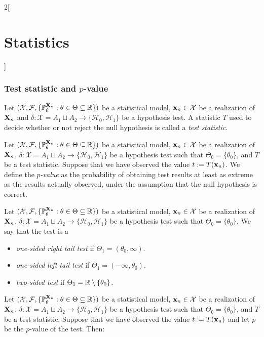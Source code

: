 \documentclass[../../../main.tex]{subfiles}
\begin{document}
\begin{multicols}{2}[\section{Statistics}]
  \subsubsection{Test statistic and \texorpdfstring{$p$}{p}-value}
  \begin{definition}
    Let $(\mathcal{X},\mathcal{F},\{\mathbb{P}_\theta^{\boldsymbol{\mathrm{X}}_n}:\theta\in\Theta\subseteq\mathbb{R}\})$ be a statistical model, $\boldsymbol{\mathrm{x}}_n\in\mathcal{X}$ be a realization of $\boldsymbol{\mathrm{X}}_n$ and $\delta:\mathcal{X}=A_1\sqcup A_2\rightarrow\{\mathcal{H}_0,\mathcal{H}_1\}$ be a hypothesis test. A statistic $T$ used to decide whether or not reject the null hypothesis is called a \emph{test statistic}.
  \end{definition}
  \begin{definition}
    Let $(\mathcal{X},\mathcal{F},\{\mathbb{P}_\theta^{\boldsymbol{\mathrm{X}}_n}:\theta\in\Theta\subseteq\mathbb{R}\})$ be a statistical model, $\boldsymbol{\mathrm{x}}_n\in\mathcal{X}$ be a realization of $\boldsymbol{\mathrm{X}}_n$, $\delta:\mathcal{X}=A_1\sqcup A_2\rightarrow\{\mathcal{H}_0,\mathcal{H}_1\}$ be a hypothesis test such that $\Theta_0=\{\theta_0\}$, and $T$ be a test statistic. Suppose that we have observed the value $t:=T(\boldsymbol{\mathrm{x}}_n)$. We define the \emph{$p$-value} as the probability of obtaining test results at least as extreme as the results actually observed, under the assumption that the null hypothesis is correct.
  \end{definition}
  \begin{definition}
    Let $(\mathcal{X},\mathcal{F},\{\mathbb{P}_\theta^{\boldsymbol{\mathrm{X}}_n}:\theta\in\Theta\subseteq\mathbb{R}\})$ be a statistical model, $\boldsymbol{\mathrm{x}}_n\in\mathcal{X}$ be a realization of $\boldsymbol{\mathrm{X}}_n$, $\delta:\mathcal{X}=A_1\sqcup A_2\rightarrow\{\mathcal{H}_0,\mathcal{H}_1\}$ be a hypothesis test such that $\Theta_0=\{\theta_0\}$. We say that the test is a
    \begin{itemize}
      \item \emph{one-sided right tail test} if $\Theta_1=(\theta_0,\infty)$.
      \item \emph{one-sided left tail test} if $\Theta_1=(-\infty,\theta_0)$.
      \item \emph{two-sided test} if $\Theta_1=\mathbb{R}\setminus\{\theta_0\}$.
    \end{itemize}
  \end{definition}
  \begin{proposition}
    Let $(\mathcal{X},\mathcal{F},\{\mathbb{P}_\theta^{\boldsymbol{\mathrm{X}}_n}:\theta\in\Theta\subseteq\mathbb{R}\})$ be a statistical model, $\boldsymbol{\mathrm{x}}_n\in\mathcal{X}$ be a realization of $\boldsymbol{\mathrm{X}}_n$, $\delta:\mathcal{X}=A_1\sqcup A_2\rightarrow\{\mathcal{H}_0,\mathcal{H}_1\}$ be a hypothesis test such that $\Theta_0=\{\theta_0\}$, and $T$ be a test statistic. Suppose that we have observed the value $t:=T(\boldsymbol{\mathrm{x}}_n)$ and let $p$ be the $p$-value of the test. Then:

\end{proposition}
\end{multicols}
\end{document}

